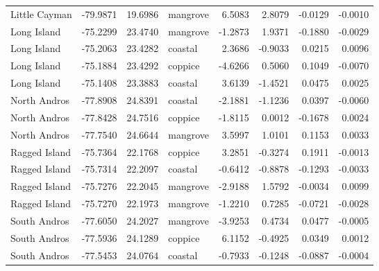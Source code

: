 \begin{tabular}{lrrlrrrr}
Little Cayman & -79.9871 & 19.6986 & mangrove & 6.5083 & 2.8079 & -0.0129 & -0.0010\\
Long Island & -75.2299 & 23.4740 & mangrove & -1.2873 & 1.9371 & -0.1880 & -0.0029\\
Long Island & -75.2063 & 23.4282 & coastal & 2.3686 & -0.9033 & 0.0215 & 0.0096\\
Long Island & -75.1884 & 23.4292 & coppice & -4.6266 & 0.5060 & 0.1049 & -0.0070\\
Long Island & -75.1408 & 23.3883 & coastal & 3.6139 & -1.4521 & 0.0475 & 0.0025\\
North Andros & -77.8908 & 24.8391 & coastal & -2.1881 & -1.1236 & 0.0397 & -0.0060\\
North Andros & -77.8428 & 24.7516 & coppice & -1.8115 & 0.0012 & -0.1678 & 0.0024\\
North Andros & -77.7540 & 24.6644 & mangrove & 3.5997 & 1.0101 & 0.1153 & 0.0033\\
Ragged Island & -75.7364 & 22.1768 & coppice & 3.2851 & -0.3274 & 0.1911 & -0.0013\\
Ragged Island & -75.7314 & 22.2097 & coastal & -0.6412 & -0.8878 & -0.1293 & -0.0033\\
Ragged Island & -75.7276 & 22.2045 & mangrove & -2.9188 & 1.5792 & -0.0034 & 0.0099\\
Ragged Island & -75.7270 & 22.1973 & mangrove & -1.2210 & 0.7285 & -0.0721 & -0.0028\\
South Andros & -77.6050 & 24.2027 & mangrove & -3.9253 & 0.4734 & 0.0477 & -0.0005\\
South Andros & -77.5936 & 24.1289 & coppice & 6.1152 & -0.4925 & 0.0349 & 0.0012\\
South Andros & -77.5453 & 24.0764 & coastal & -0.7933 & -0.1248 & -0.0887 & -0.0004\\
\bottomrule
\end{tabular}

